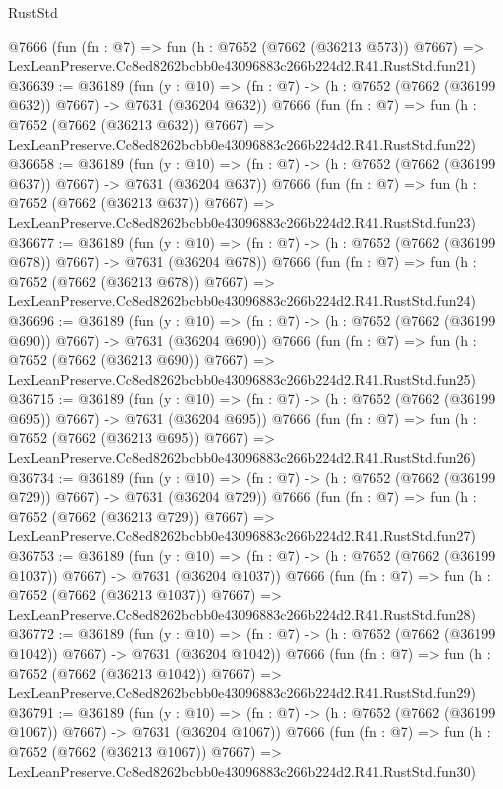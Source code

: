 \begin{lexlean}{RustStd}
\begin{coremodule}
    @7666
    (fun (fn : @7) =>
    fun (h : @7652 (@7662 (@36213 @573)) @7667) =>
    LexLeanPreserve.Cc8ed8262bcbb0e43096883c266b224d2.R41.RustStd.fun21)
@36639 := @36189
    (fun (y : @10) => (fn : @7) -> (h : @7652 (@7662 (@36199 @632)) @7667) -> @7631 (@36204 @632))
    @7666
    (fun (fn : @7) =>
    fun (h : @7652 (@7662 (@36213 @632)) @7667) =>
    LexLeanPreserve.Cc8ed8262bcbb0e43096883c266b224d2.R41.RustStd.fun22)
@36658 := @36189
    (fun (y : @10) => (fn : @7) -> (h : @7652 (@7662 (@36199 @637)) @7667) -> @7631 (@36204 @637))
    @7666
    (fun (fn : @7) =>
    fun (h : @7652 (@7662 (@36213 @637)) @7667) =>
    LexLeanPreserve.Cc8ed8262bcbb0e43096883c266b224d2.R41.RustStd.fun23)
@36677 := @36189
    (fun (y : @10) => (fn : @7) -> (h : @7652 (@7662 (@36199 @678)) @7667) -> @7631 (@36204 @678))
    @7666
    (fun (fn : @7) =>
    fun (h : @7652 (@7662 (@36213 @678)) @7667) =>
    LexLeanPreserve.Cc8ed8262bcbb0e43096883c266b224d2.R41.RustStd.fun24)
@36696 := @36189
    (fun (y : @10) => (fn : @7) -> (h : @7652 (@7662 (@36199 @690)) @7667) -> @7631 (@36204 @690))
    @7666
    (fun (fn : @7) =>
    fun (h : @7652 (@7662 (@36213 @690)) @7667) =>
    LexLeanPreserve.Cc8ed8262bcbb0e43096883c266b224d2.R41.RustStd.fun25)
@36715 := @36189
    (fun (y : @10) => (fn : @7) -> (h : @7652 (@7662 (@36199 @695)) @7667) -> @7631 (@36204 @695))
    @7666
    (fun (fn : @7) =>
    fun (h : @7652 (@7662 (@36213 @695)) @7667) =>
    LexLeanPreserve.Cc8ed8262bcbb0e43096883c266b224d2.R41.RustStd.fun26)
@36734 := @36189
    (fun (y : @10) => (fn : @7) -> (h : @7652 (@7662 (@36199 @729)) @7667) -> @7631 (@36204 @729))
    @7666
    (fun (fn : @7) =>
    fun (h : @7652 (@7662 (@36213 @729)) @7667) =>
    LexLeanPreserve.Cc8ed8262bcbb0e43096883c266b224d2.R41.RustStd.fun27)
@36753 := @36189
    (fun (y : @10) => (fn : @7) -> (h : @7652 (@7662 (@36199 @1037)) @7667) -> @7631 (@36204 @1037))
    @7666
    (fun (fn : @7) =>
    fun (h : @7652 (@7662 (@36213 @1037)) @7667) =>
    LexLeanPreserve.Cc8ed8262bcbb0e43096883c266b224d2.R41.RustStd.fun28)
@36772 := @36189
    (fun (y : @10) => (fn : @7) -> (h : @7652 (@7662 (@36199 @1042)) @7667) -> @7631 (@36204 @1042))
    @7666
    (fun (fn : @7) =>
    fun (h : @7652 (@7662 (@36213 @1042)) @7667) =>
    LexLeanPreserve.Cc8ed8262bcbb0e43096883c266b224d2.R41.RustStd.fun29)
@36791 := @36189
    (fun (y : @10) => (fn : @7) -> (h : @7652 (@7662 (@36199 @1067)) @7667) -> @7631 (@36204 @1067))
    @7666
    (fun (fn : @7) =>
    fun (h : @7652 (@7662 (@36213 @1067)) @7667) =>
    LexLeanPreserve.Cc8ed8262bcbb0e43096883c266b224d2.R41.RustStd.fun30)

\end{coremodule}
\end{lexlean}
